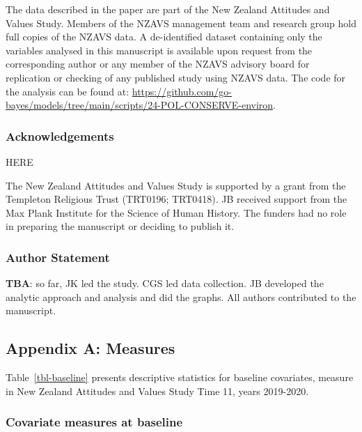 \documentclass[
  single column]{article}
\begin{document}
The data described in the paper are part of the New Zealand Attitudes
and Values Study. Members of the NZAVS management team and research
group hold full copies of the NZAVS data. A de-identified dataset
containing only the variables analysed in this manuscript is available
upon request from the corresponding author or any member of the NZAVS
advisory board for replication or checking of any published study using
NZAVS data. The code for the analysis can be found at:
\url{https://github.com/go-bayes/models/tree/main/scripts/24-POL-CONSERVE-environ}.

\subsubsection{Acknowledgements}\label{acknowledgements}

HERE

The New Zealand Attitudes and Values Study is supported by a grant from
the Templeton Religious Trust (TRT0196; TRT0418). JB received support
from the Max Plank Institute for the Science of Human History. The
funders had no role in preparing the manuscript or deciding to publish
it.

\subsubsection{Author Statement}\label{author-statement}

\textbf{TBA}: so far, JK led the study. CGS led data collection. JB
developed the analytic approach and analysis and did the graphs. All
authors contributed to the manuscript.

\newpage{}

\subsection{Appendix A: Measures}\label{appendix-a}

Table~\ref{tbl-baseline} presents descriptive statistics for baseline
covariates, measure in New Zealand Attitudes and Values Study Time 11,
years 2019-2020.

\subsubsection{Covariate measures at
baseline}\label{covariate-measures-at-baseline}
\end{document}
